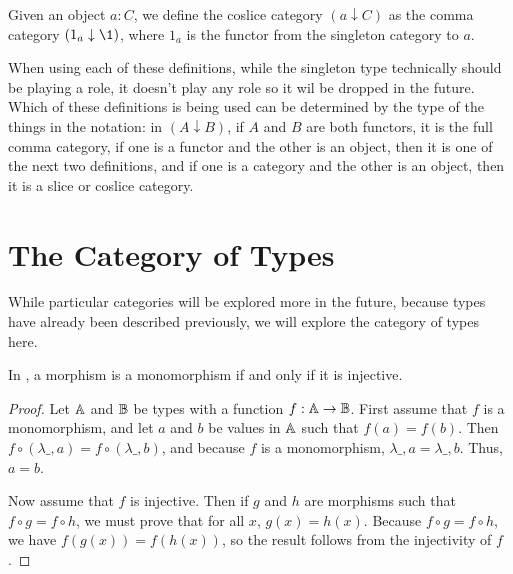 \documentclass[../../math.tex]{subfiles}
\begin{document}
\begin{definition}
    Given an object $a : C$, we define the coslice category $(a \downarrow C)$
    as the comma category $(1_a \downarrow \1)$, where $1_a$ is the functor from
    the singleton category to $a$.
\end{definition}

When using each of these definitions, while the singleton type technically
should be playing a role, it doesn't play any role so it wil be dropped in the
future.  Which of these definitions is being used can be determined by the type
of the things in the notation: in $(A \downarrow B)$, if $A$ and $B$ are both
functors, it is the full comma category, if one is a functor and the other is an
object, then it is one of the next two definitions, and if one is a category and
the other is an object, then it is a slice or coslice category.

\section{The Category of Types}

While particular categories will be explored more in the future, because types
have already been described previously, we will explore the category of types
here.

\begin{theorem}
    In \Type, a morphism is a monomorphism if and only if it is injective.
\end{theorem}
\begin{proof}
    Let $\mathbb{A}$ and $\mathbb{B}$ be types with a function $f : \mathbb{A} \to \mathbb{B}$.  First assume
    that $f$ is a monomorphism, and let $a$ and $b$ be values in $\mathbb{A}$ such that
    $f(a) = f(b)$.  Then $f \circ (\lambda \_, a) = f \circ (\lambda \_, b)$,
    and because $f$ is a monomorphism, $\lambda \_, a = \lambda \_, b$.  Thus,
    $a = b$.

    Now assume that $f$ is injective.  Then if $g$ and $h$ are morphisms such
    that $f \circ g = f \circ h$, we must prove that for all $x$, $g(x) = h(x)$.
    Because $f \circ g = f \circ h$, we have $f(g(x)) = f(h(x))$, so the result
    follows from the injectivity of $f$.
\end{proof}
\end{document}

